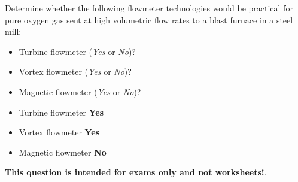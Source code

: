 

Determine whether the following flowmeter technologies would be practical for pure oxygen gas sent at high volumetric flow rates to a blast furnace in a steel mill:

\begin{itemize}
\item{} Turbine flowmeter ({\it Yes} or {\it No})?
\vskip 10pt
\item{} Vortex flowmeter ({\it Yes} or {\it No})?
\vskip 10pt
\item{} Magnetic flowmeter ({\it Yes} or {\it No})?
\end{itemize}







\begin{itemize}
\item{} Turbine flowmeter {\bf Yes}
\item{} Vortex flowmeter {\bf Yes}
\item{} Magnetic flowmeter {\bf No}
\end{itemize}







{\bf This question is intended for exams only and not worksheets!}.



